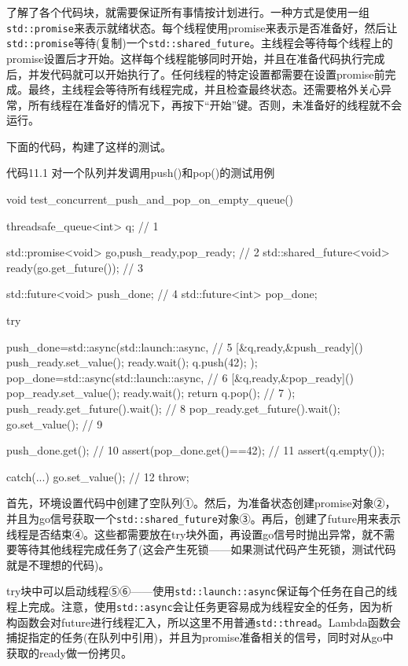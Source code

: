 了解了各个代码块，就需要保证所有事情按计划进行。一种方式是使用一组\texttt{std::promise}来表示就绪状态。每个线程使用promise来表示是否准备好，然后让\texttt{std::promise}等待(复制)一个\texttt{std::shared\_future}。主线程会等待每个线程上的promise设置后才开始。这样每个线程能够同时开始，并且在准备代码执行完成后，并发代码就可以开始执行了。任何线程的特定设置都需要在设置promise前完成。最终，主线程会等待所有线程完成，并且检查最终状态。还需要格外关心异常，所有线程在准备好的情况下，再按下“开始”键。否则，未准备好的线程就不会运行。

下面的代码，构建了这样的测试。

代码11.1 对一个队列并发调用push()和pop()的测试用例
\begin{cpp}
void test_concurrent_push_and_pop_on_empty_queue()
{
  threadsafe_queue<int> q;  // 1

  std::promise<void> go,push_ready,pop_ready;  // 2
  std::shared_future<void> ready(go.get_future());  // 3

  std::future<void> push_done;  // 4
  std::future<int> pop_done;

  try
  {
    push_done=std::async(std::launch::async,  // 5
                         [&q,ready,&push_ready]()
                         {
                           push_ready.set_value();
                           ready.wait();
                           q.push(42);
                         }
      );
    pop_done=std::async(std::launch::async,  // 6
                        [&q,ready,&pop_ready]()
                        {
                          pop_ready.set_value();
                          ready.wait();
                          return q.pop();  // 7
                        }
      );
    push_ready.get_future().wait();  // 8
    pop_ready.get_future().wait();
    go.set_value();  // 9

    push_done.get();  // 10
    assert(pop_done.get()==42);  // 11
    assert(q.empty());
  }
  catch(...)
  {
    go.set_value();  // 12
    throw;
  }
}
\end{cpp}

首先，环境设置代码中创建了空队列①。然后，为准备状态创建promise对象②，并且为go信号获取一个\texttt{std::shared\_future}对象③。再后，创建了future用来表示线程是否结束④。这些都需要放在try块外面，再设置go信号时抛出异常，就不需要等待其他线程完成任务了(这会产生死锁——如果测试代码产生死锁，测试代码就是不理想的代码)。

try块中可以启动线程⑤⑥——使用\texttt{std::launch::async}保证每个任务在自己的线程上完成。注意，使用\texttt{std::async}会让任务更容易成为线程安全的任务，因为析构函数会对future进行线程汇入，所以这里不用普通\texttt{std::thread}。Lambda函数会捕捉指定的任务(在队列中引用)，并且为promise准备相关的信号，同时对从go中获取的ready做一份拷贝。


